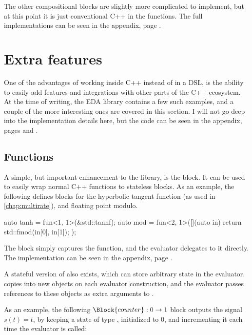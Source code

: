 The other compositional blocks are slightly more complicated to implement, but at this point it is just
conventional C++ in the  functions. The full implementations can be seen in the
appendix, page \pageref{code:comp_eval}.

\section{Extra features}

One of the advantages of working inside C++ instead of in a DSL, is the ability to easily add features and
integrations with other parts of the C++ ecosystem. At the time of writing, the EDA library contains a few
such examples, and a couple of the more interesting ones are covered in this section. I will not go deep into
the implementation details here, but the code can be seen in the appendix, pages \pageref{code:extra_block} and
\pageref{code:extra_eval}.

\subsection{Functions}

A simple, but important enhancement to the library, is the  block. It can be used to
easily wrap normal C++ functions to stateless blocks. As an example, the following defines blocks for the
hyperbolic tangent function (as used in \autoref{chap:multirate}), and floating point modulo.

\begin{cppcodenl}
  auto tanh = fun<1, 1>(&std::tanhf);
  auto mod = fun<2, 1>([](auto in) { return std::fmod(in[0], in[1]); });
\end{cppcodenl}

The  block simply captures the function, and the evaluator delegates to it directly.
The implementation can be seen in the appendix, page \pageref{code:extra_block}.

A stateful version of  also exists, which can store arbitrary state in the evaluator.  copies 
into new objects on each evaluator construction, and the evaluator passes references to these objects as
extra arguments to .

As an example, the following $\Block{counter} : 0 \rightarrow 1$ block outputs the signal $s(t) = t$, by
keeping a state of type , initialized to $0$, and incrementing it
each time the evaluator is called:

